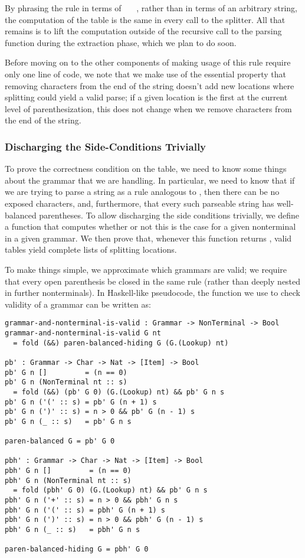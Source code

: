     By phrasing the rule in terms of ~~~, rather than in terms of an arbitrary string, the computation of the table is the same in every call to the splitter.  All that remains is to lift the computation outside of the recursive call to the parsing function during the extraction phase, which we plan to do soon. 
    
    Before moving on to the other components of making usage of this rule require only one line of code, we note that we make use of the essential property that removing characters from the end of the string doesn't add new locations where splitting could yield a valid parse; if a given location is the first \terminal{+} at the current level of parenthesization, this does not change when we remove characters from the end of the string.  
    
  \subsubsection{Discharging the Side-Conditions Trivially}
    To prove the correctness condition on the table, we need to know some things about the grammar that we are handling.  In particular, we need to know that if we are trying to parse a string as a rule analogous to , then there can be no exposed \terminal{+} characters, and, furthermore, that every such parseable string has well-balanced parentheses.  To allow discharging the side conditions trivially, we define a function that computes whether or not this is the case for a given nonterminal in a given grammar.  We then prove that, whenever this function returns \true, valid tables yield complete lists of splitting locations.
    
    To make things simple, we approximate which grammars are valid; we require that every open parenthesis be closed in the same rule (rather than deeply nested in further nonterminals).  In Haskell-like pseudocode, the function we use to check validity of a grammar can be written as:
\begin{verbatim}
grammar-and-nonterminal-is-valid : Grammar -> NonTerminal -> Bool
grammar-and-nonterminal-is-valid G nt
  = fold (&&) paren-balanced-hiding G (G.(Lookup) nt)

pb' : Grammar -> Char -> Nat -> [Item] -> Bool
pb' G n []         = (n == 0)
pb' G n (NonTerminal nt :: s)
  = fold (&&) (pb' G 0) (G.(Lookup) nt) && pb' G n s
pb' G n ('(' :: s) = pb' G (n + 1) s
pb' G n (')' :: s) = n > 0 && pb' G (n - 1) s
pb' G n (_ :: s)   = pb' G n s

paren-balanced G = pb' G 0

pbh' : Grammar -> Char -> Nat -> [Item] -> Bool
pbh' G n []         = (n == 0)
pbh' G n (NonTerminal nt :: s)
  = fold (pbh' G 0) (G.(Lookup) nt) && pb' G n s
pbh' G n ('+' :: s) = n > 0 && pbh' G n s
pbh' G n ('(' :: s) = pbh' G (n + 1) s
pbh' G n (')' :: s) = n > 0 && pbh' G (n - 1) s
pbh' G n (_ :: s)   = pbh' G n s

paren-balanced-hiding G = pbh' G 0
\end{verbatim}    
    
